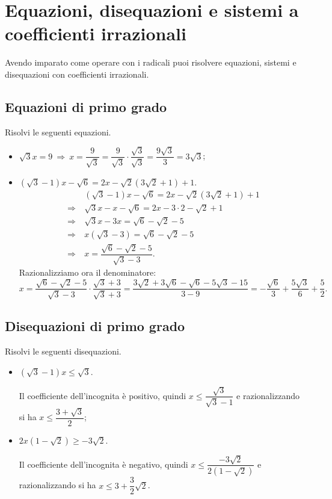 \section{Equazioni, disequazioni e sistemi a coefficienti irrazionali}

Avendo imparato come operare con i radicali puoi risolvere equazioni, sistemi e disequazioni con coefficienti irrazionali.

\subsection{Equazioni di primo grado}

\begin{exrig}
\begin{esempio}
Risolvi le seguenti equazioni.
\begin{itemize}
 \item $\sqrt 3x=9\:\Rightarrow\: x=\dfrac 9{\sqrt 3} =\dfrac 9{\sqrt 3}\cdot \dfrac{\sqrt 3}{\sqrt 3}=\dfrac{9\sqrt 3} 3=3\sqrt 3$;
 \item $(\sqrt 3-1)x-\sqrt 6=2x-\sqrt 2(3\sqrt 2+1)+1$.
 \begin{align*}
&(\sqrt 3-1)x-\sqrt 6=2x-\sqrt 2(3\sqrt 2+1)+1\\
 \Rightarrow\:&\sqrt 3x-x-\sqrt 6=2x-3\cdot 2-\sqrt 2+1\\
 \Rightarrow\:&\sqrt 3x-3x=\sqrt 6-\sqrt 2-5\\
 \Rightarrow\:&x(\sqrt 3-3)=\sqrt 6-\sqrt 2-5\\
 \Rightarrow\:&x=\dfrac{\sqrt 6-\sqrt 2-5}{\sqrt 3-3}.
 \end{align*}
Razionalizziamo ora il denominatore:
 \[x=\dfrac{\sqrt 6-\sqrt 2-5}{\sqrt 3-3}\cdot \dfrac{\sqrt 3+3}{\sqrt 3+3}=\dfrac{3\sqrt 2+3\sqrt 6-\sqrt 6-5\sqrt 3-15}{3-9}=%
 -\dfrac{\sqrt 6} 3+\dfrac{5\sqrt 3} 6+\dfrac 5 2.\]
\end{itemize}
\end{esempio}
\end{exrig}

\subsection{Disequazioni di primo grado}
\begin{exrig}
\begin{esempio}
Risolvi le seguenti disequazioni.
 \begin{itemize}
 \item $(\sqrt 3-1)x\le \sqrt 3$.

Il coefficiente dell'incognita è positivo, quindi $x\le \dfrac{\sqrt 3}{\sqrt 3-1}$ e razionalizzando si ha $x\le \dfrac{3+\sqrt 3} 2$;
 \item $2x(1-\sqrt 2)\ge -3\sqrt 2$.

Il coefficiente dell'incognita è negativo, quindi $x\le \dfrac{-3\sqrt 2}{2(1-\sqrt 2)}$ e razionalizzando si ha $x\le 3+\dfrac 3 2\sqrt 2$.
 \end{itemize}

\end{esempio}
\end{exrig}

